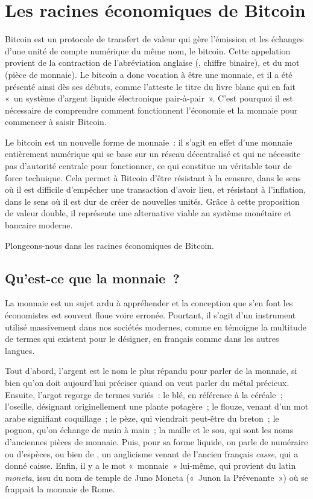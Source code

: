 
\chapter{Les racines économiques de Bitcoin}
\label{ch:origine}

Bitcoin est un protocole de transfert de valeur qui gère l'émission et les échanges d'une unité de compte numérique du même nom, le bitcoin. Cette appelation provient de la contraction de l'abréviation anglaise  (, chiffre binaire), et du mot  (pièce de monnaie). Le bitcoin a donc vocation à être une monnaie, et il a été présenté ainsi dès ses débuts, comme l'atteste le titre du livre blanc qui en fait «~un système d'argent liquide électronique pair-à-pair~». C'est pourquoi il est nécessaire de comprendre comment fonctionnent l'économie et la monnaie pour commencer à saisir Bitcoin.

Le bitcoin est un nouvelle forme de monnaie~: il s'agit en effet d'une monnaie entièrement numérique qui se base sur un réseau décentralisé et qui ne nécessite pas d'autorité centrale pour fonctionner, ce qui constitue un véritable tour de force technique. Cela permet à Bitcoin d'être résistant à la censure, dans le sens où il est difficile d'empêcher une transaction d'avoir lieu, et résistant à l'inflation, dans le sens où il est dur de créer de nouvelles unités. Grâce à cette proposition de valeur double, il représente une alternative viable au système monétaire et bancaire moderne.

Plongeons-nous dans les racines économiques de Bitcoin.

\section*{Qu'est-ce que la monnaie~?}

La monnaie est un sujet ardu à appréhender et la conception que s'en font les économistes est souvent floue voire erronée. Pourtant, il s'agit d'un instrument utilisé massivement dans nos sociétés modernes, comme en témoigne la multitude de termes qui existent pour le désigner, en français comme dans les autres langues.

Tout d'abord, l'argent est le nom le plus répandu pour parler de la monnaie, si bien qu'on doit aujourd'hui préciser quand on veut parler du métal précieux. Ensuite, l'argot regorge de termes variés~: le blé, en référence à la céréale~; l'oseille, désignant originellement une plante potagère~; le flouze, venant d'un mot arabe signifiant coquillage~; le pèze, qui viendrait peut-être du breton~; le pognon, qu'on échange de main à main~; la maille et le sou, qui sont les noms d'anciennes pièces de monnaie. Puis, pour sa forme liquide, on parle de numéraire ou d'espèces, ou bien de , un anglicisme venant de l'ancien français \emph{casse}, qui a donné caisse. Enfin, il y a le mot «~monnaie~» lui-même, qui provient du latin \emph{moneta}, issu du nom de temple de Juno Moneta («~Junon la Prévenante~») où se frappait la monnaie de Rome.

